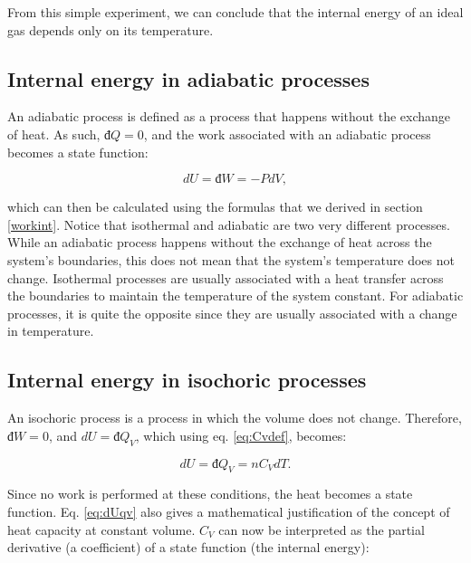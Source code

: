 \documentclass[
  9pt,
]{extbook}
\theoremstyle{definition}
\theoremstyle{definition}
\theoremstyle{definition}
\theoremstyle{remark}
\begin{document}
From this simple experiment, we can conclude that the internal energy of an ideal gas depends only on its temperature.

\hypertarget{internal-energy-in-adiabatic-processes}{%
\subsection{Internal energy in adiabatic processes}\label{internal-energy-in-adiabatic-processes}}

An adiabatic process is defined as a process that happens without the exchange of heat. As such, \(đ Q=0\), and the work associated with an adiabatic process becomes a state function:

\begin{equation}
  dU=đ W=-PdV,
  \label{eq:dUadiabatic}
\end{equation}

which can then be calculated using the formulas that we derived in section \ref{workint}. Notice that isothermal and adiabatic are two very different processes. While an adiabatic process happens without the exchange of heat across the system's boundaries, this does not mean that the system's temperature does not change. Isothermal processes are usually associated with a heat transfer across the boundaries to maintain the temperature of the system constant. For adiabatic processes, it is quite the opposite since they are usually associated with a change in temperature.

\hypertarget{internal-energy-in-isochoric-processes}{%
\subsection{Internal energy in isochoric processes}\label{internal-energy-in-isochoric-processes}}

An isochoric process is a process in which the volume does not change. Therefore, \(đ W=0\), and \(dU = đ Q_V\), which using eq. \eqref{eq:Cvdef}, becomes:

\begin{equation}
  dU = đ Q_V = n C_V dT.
  \label{eq:dUqv}
\end{equation}

Since no work is performed at these conditions, the heat becomes a state function. Eq. \eqref{eq:dUqv} also gives a mathematical justification of the concept of heat capacity at constant volume. \(C_V\) can now be interpreted as the partial derivative (a coefficient) of a state function (the internal energy):
\end{document}
